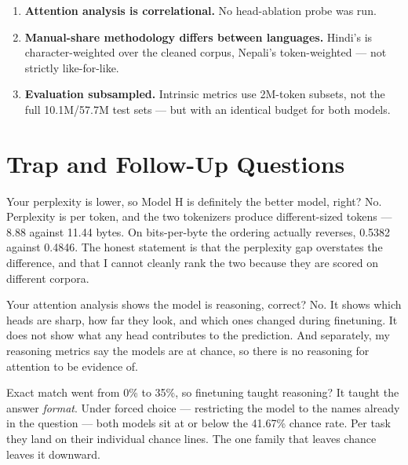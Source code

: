 \documentclass[11pt]{report}
\begin{document}
\begin{enumerate}
\item \textbf{Attention analysis is correlational.} No head-ablation probe was
run.

\item \textbf{Manual-share methodology differs between languages.} Hindi's is
character-weighted over the cleaned corpus, Nepali's token-weighted --- not
strictly like-for-like.

\item \textbf{Evaluation subsampled.} Intrinsic metrics use 2M-token subsets,
not the full 10.1M/57.7M test sets --- but with an identical budget for both
models.
\end{enumerate}

\chapter{Trap and Follow-Up Questions}

\begin{qabox}{Your perplexity is lower, so Model H is definitely the better model, right?}
No. Perplexity is per token, and the two tokenizers produce different-sized
tokens --- 8.88 against 11.44 bytes. On bits-per-byte the ordering actually
reverses, 0.5382 against 0.4846. The honest statement is that the perplexity
gap overstates the difference, and that I cannot cleanly rank the two because
they are scored on different corpora.
\end{qabox}

\begin{qabox}{Your attention analysis shows the model is reasoning, correct?}
No. It shows which heads are sharp, how far they look, and which ones changed
during finetuning. It does not show what any head contributes to the
prediction. And separately, my reasoning metrics say the models are at chance,
so there is no reasoning for attention to be evidence of.
\end{qabox}

\begin{qabox}{Exact match went from 0\% to 35\%, so finetuning taught reasoning?}
It taught the answer \emph{format}. Under forced choice --- restricting the
model to the names already in the question --- both models sit at or below the
41.67\% chance rate. Per task they land on their individual chance lines. The
one family that leaves chance leaves it downward.
\end{qabox}
\end{document}

